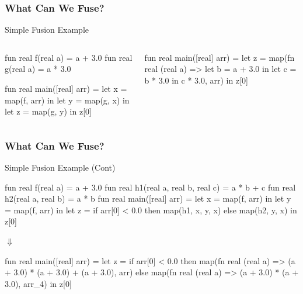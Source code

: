 \documentclass{beamer}
\begin{document}
\begin{frame}[fragile,t]
  \frametitle{What Can We Fuse?}

  \begin{block}{Simple Fusion Example}\vspace{-1ex}
    \begin{columns}
      \vspace{-1ex}
      \begin{colorcode}[fontsize=\scriptsize]
fun real f(real a) = a + 3.0
fun real g(real a) = a * 3.0

fun real main([real] arr) =
  let x = map(f, arr) in
  let y = map(g, x)   in
  let z = map(g, y)   in
  z[0]
      \end{colorcode}
      \begin{colorcode}[fontsize=\scriptsize]
fun real main([real] arr) =
  let z = map(fn real (real a) =>
                let b = a + 3.0 in
                let c = b * 3.0 in
                c * 3.0, arr) in
  z[0]
      \end{colorcode}
    \end{columns}
  \end{block}

\end{frame}
\begin{frame}[fragile,t]
  \frametitle{What Can We Fuse?}
  \begin{block}{Simple Fusion Example (Cont)}
\begin{center}
    \begin{colorcode}[fontsize=\scriptsize]
fun real f(real a) = a + 3.0
fun real h1(real a, real b, real c) = a * b + c
fun real h2(real a, real b) = a * b
fun real main([real] arr) =
  let x = map(f, arr) in
  let y = map(f, arr) in
  let z = if arr[0] < 0.0
            then map(h1, x, y, x)
            else map(h2, y, x) in
  z[0]
    \end{colorcode}
$\Downarrow$
    \begin{colorcode}
fun real main([real] arr) =
  let z =
    if arr[0] < 0.0 then
      map(fn real (real a) => (a + 3.0) * (a + 3.0) + (a + 3.0), arr)
    else map(fn real (real a) => (a + 3.0) * (a + 3.0), arr_4)
  in z[0]
    \end{colorcode}
\end{center}
  \end{block}
\end{frame}
\end{document}
